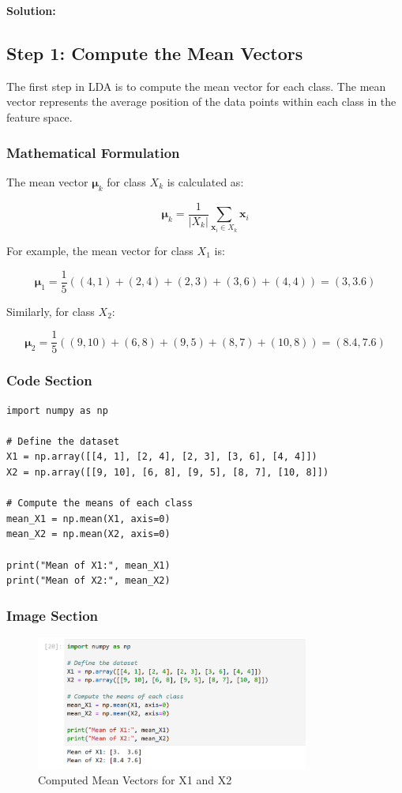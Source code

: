 \documentclass{exam}
\begin{document}
\textbf{Solution:}

\subsection{Step 1: Compute the Mean Vectors}

The first step in LDA is to compute the mean vector for each class. The mean vector represents the average position of the data points within each class in the feature space.

\subsubsection*{Mathematical Formulation}

The mean vector \( \mathbf{\mu}_k \) for class \( X_k \) is calculated as:

\[
\mathbf{\mu}_k = \frac{1}{|X_k|} \sum_{\mathbf{x}_i \in X_k} \mathbf{x}_i
\]

For example, the mean vector for class \( X_1 \) is:

\[
\mathbf{\mu}_1 = \frac{1}{5} \left( (4,1) + (2,4) + (2,3) + (3,6) + (4,4) \right) = (3, 3.6)
\]

Similarly, for class \( X_2 \):

\[
\mathbf{\mu}_2 = \frac{1}{5} \left( (9,10) + (6,8) + (9,5) + (8,7) + (10,8) \right) = (8.4, 7.6)
\]

\subsubsection*{Code Section}

\begin{verbatim}
import numpy as np

# Define the dataset
X1 = np.array([[4, 1], [2, 4], [2, 3], [3, 6], [4, 4]])
X2 = np.array([[9, 10], [6, 8], [9, 5], [8, 7], [10, 8]])

# Compute the means of each class
mean_X1 = np.mean(X1, axis=0)
mean_X2 = np.mean(X2, axis=0)

print("Mean of X1:", mean_X1)
print("Mean of X2:", mean_X2)
\end{verbatim}

\subsubsection*{Image Section}

\begin{figure}[h!]
    \centering
    \includegraphics[width=0.8\textwidth]{images/mean_x1_x2.png}
    \caption{Computed Mean Vectors for X1 and X2}
    \label{fig:mean_x1_x2}
\end{figure}
\end{document}
